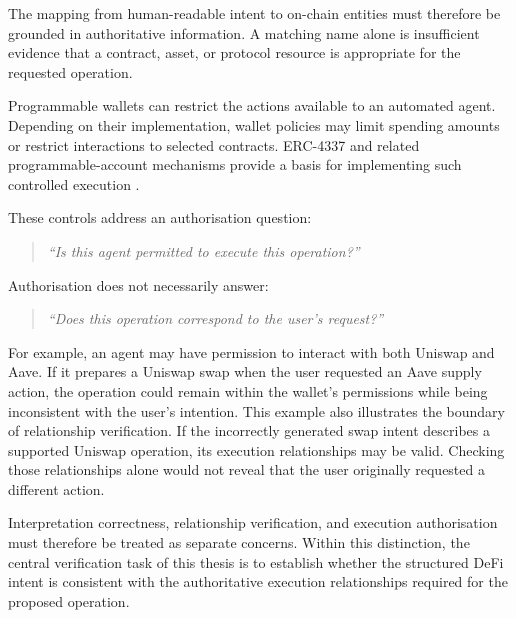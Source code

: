 The mapping from human-readable intent to on-chain entities must
therefore be grounded in authoritative information. A matching name
alone is insufficient evidence that a contract, asset, or protocol
resource is appropriate for the requested operation.


Programmable wallets can restrict the actions available to an automated
agent. Depending on their implementation, wallet policies may limit
spending amounts or restrict interactions to selected contracts.
ERC-4337 and related programmable-account mechanisms provide a basis
for implementing such controlled execution
\cite{buterinERC4337AccountAbstraction2021,
linMeasurementInvestigationERC43372024}.

These controls address an authorisation question:

\begin{quote}
\textit{``Is this agent permitted to execute this operation?''}
\end{quote}

Authorisation does not necessarily answer:

\begin{quote}
\textit{``Does this operation correspond to the user's request?''}
\end{quote}

For example, an agent may have permission to interact with both Uniswap
and Aave. If it prepares a Uniswap swap when the user requested an Aave
supply action, the operation could remain within the wallet's
permissions while being inconsistent with the user's intention. This example also illustrates the boundary of relationship
verification. If the incorrectly generated swap intent describes a
supported Uniswap operation, its execution relationships may be valid.
Checking those relationships alone would not reveal that the user
originally requested a different action.

Interpretation correctness, relationship verification, and execution
authorisation must therefore be treated as separate concerns. Within
this distinction, the central verification task of this thesis is to
establish whether the structured DeFi intent is consistent with the
authoritative execution relationships required for the proposed
operation.


